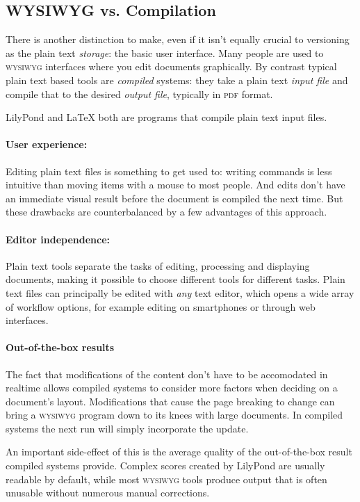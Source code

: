 \documentclass[11pt,a4paper]{article}
\begin{document}
\subsection{WYSIWYG vs. Compilation}
There is another distinction to make, even if it isn't equally crucial to versioning
as the plain text \emph{storage}: the basic user interface. Many people are used to
\textsc{wysiwyg} interfaces where you edit documents graphically. By contrast typical
plain text based tools are \emph{compiled} systems: they take a plain text \emph{input
file} and compile that to the desired \emph{output file}, typically in
\textsc{pdf} format.

LilyPond and \LaTeX{} both are programs that compile plain text input files.

\paragraph{User experience:}
Editing plain text files is something to get used to: writing commands is less intuitive
than moving items with a mouse to most people. And edits don't have an immediate visual
result before the document is compiled the next time. But these drawbacks are counterbalanced
by a few advantages of this approach.

\paragraph{Editor independence:}
Plain text tools separate the tasks of editing, processing and displaying documents,
making it possible to choose different tools for different tasks. Plain text files
can principally be edited with \emph{any} text editor, which opens a wide array of
workflow options, for example editing on smartphones or through web interfaces.

\paragraph{Out-of-the-box results}
The fact that modifications of the content don't have to be accomodated in realtime
allows compiled systems to consider more factors when deciding on a document's layout.
Modifications that cause the page breaking to change can bring a
\textsc{wysiwyg} program down to its knees with large documents. In compiled systems the
next run will simply incorporate the update.

An important side-effect of this is the average quality of the out-of-the-box result
compiled systems provide. Complex scores created by LilyPond are usually readable by
default, while most \textsc{wysiwyg} tools produce output that is often unusable without
numerous manual corrections.
\end{document}
